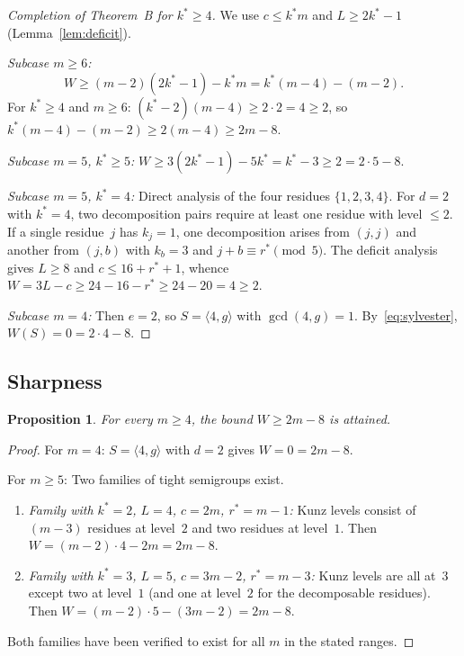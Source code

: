 \documentclass[11pt]{amsart}
\newtheorem{proposition}[theorem]{Proposition}
\theoremstyle{definition}
\theoremstyle{remark}
\begin{document}
\begin{proof}[Completion of Theorem~B for $k^* \ge 4$]
We use $c \le k^* m$ and $L \ge 2k^* - 1$ (Lemma~\ref{lem:deficit}).

\medskip
\emph{Subcase $m \ge 6$:}
\[
  W \ge (m - 2)(2k^* - 1) - k^* m = k^*(m - 4) - (m - 2).
\]
For $k^* \ge 4$ and $m \ge 6$:
$(k^* - 2)(m - 4) \ge 2 \cdot 2 = 4 \ge 2$,
so $k^*(m - 4) - (m - 2) \ge 2(m - 4) \ge 2m - 8$.

\medskip
\emph{Subcase $m = 5$, $k^* \ge 5$:}
$W \ge 3(2k^* - 1) - 5k^* = k^* - 3 \ge 2 = 2 \cdot 5 - 8$.

\medskip
\emph{Subcase $m = 5$, $k^* = 4$:}
Direct analysis of the four residues $\{1, 2, 3, 4\}$.
For $d = 2$ with $k^* = 4$, two decomposition pairs require at least one
residue with level $\le 2$.  If a single residue~$j$ has $k_j = 1$,
one decomposition arises from $(j, j)$ and another from $(j, b)$
with $k_b = 3$ and $j + b \equiv r^* \pmod{5}$.
The deficit analysis gives $L \ge 8$ and $c \le 16 + r^* + 1$,
whence $W = 3L - c \ge 24 - 16 - r^* \ge 24 - 20 = 4 \ge 2$.

\medskip
\emph{Subcase $m = 4$:}
Then $e = 2$, so $S = \langle 4, g \rangle$ with $\gcd(4, g) = 1$.
By~\eqref{eq:sylvester}, $W(S) = 0 = 2 \cdot 4 - 8$.
\end{proof}

\subsection{Sharpness}

\begin{proposition}\label{prop:tight-B}
For every $m \ge 4$, the bound $W \ge 2m - 8$ is attained.
\end{proposition}

\begin{proof}
For $m = 4$: $S = \langle 4, g \rangle$ with $d = 2$ gives $W = 0 = 2m - 8$.

For $m \ge 5$: Two families of tight semigroups exist.
\begin{enumerate}[nosep]
  \item \emph{Family with $k^* = 2$, $L = 4$, $c = 2m$, $r^* = m - 1$:}
    Kunz levels consist of $(m - 3)$ residues at level~$2$ and two
    residues at level~$1$.  Then $W = (m-2) \cdot 4 - 2m = 2m - 8$.
  \item \emph{Family with $k^* = 3$, $L = 5$, $c = 3m - 2$, $r^* = m - 3$:}
    Kunz levels are all at~$3$ except two at level~$1$ (and one at level~$2$
    for the decomposable residues).  Then $W = (m-2) \cdot 5 - (3m - 2) = 2m - 8$.
\end{enumerate}
Both families have been verified to exist for all $m$ in the stated ranges.
\end{proof}
\end{document}
